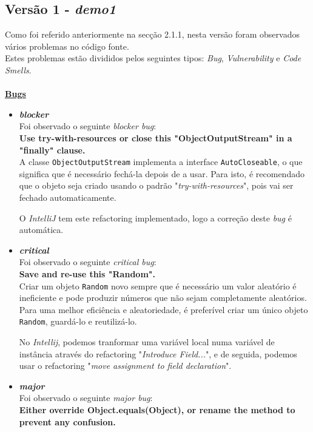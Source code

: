 \documentclass[a4paper]{report}
\begin{document}
\subsection{Versão 1 - \textit{demo1}}
Como foi referido anteriormente na secção 2.1.1, nesta versão foram observados vários problemas no código fonte.\\
Estes problemas estão divididos pelos seguintes tipos: \textit{Bug}, \textit{Vulnerability} e \textit{Code Smells}.\\\\
\underline{\textbf{Bugs}}
\begin{itemize}
    \item \textit{\textbf{blocker}}\\
        Foi observado o seguinte \textit{blocker bug}:\\
        \textbf{Use try-with-resources or close this "ObjectOutputStream" in a "finally" clause.}\\
        
        A classe \texttt{ObjectOutputStream} implementa a interface \texttt{AutoCloseable}, o que significa que é necessário fechá-la depois de a usar. Para isto, é recomendado que o objeto seja criado usando o padrão "\textit{try-with-resources}", pois vai ser fechado automaticamente.
        
        O \textit{IntelliJ} tem este refactoring implementado, logo a correção deste \textit{bug} é automática.

    
    \item \textit{\textbf{critical}}\\
        Foi observado o seguinte \textit{critical bug}:\\
        \textbf{Save and re-use this "Random".}\\
        
        Criar um objeto \texttt{Random} novo sempre que é necessário um valor aleatório é ineficiente e pode produzir números que não sejam completamente aleatórios. Para uma melhor eficiência e aleatoriedade, é preferível criar um único objeto \texttt{Random}, guardá-lo e reutilizá-lo.
        
        No \textit{Intellij}, podemos tranformar uma variável local numa variável de instância através do refactoring "\textit{Introduce Field...}", e de seguida, podemos usar o refactoring "\textit{move assignment to field declaration}".
        
        
    \item \textit{\textbf{major}}\\
        Foi observado o seguinte \textit{major bug}:\\
        \textbf{Either override Object.equals(Object), or rename the method to prevent any confusion.}\\
        

\end{itemize}
\end{document}
